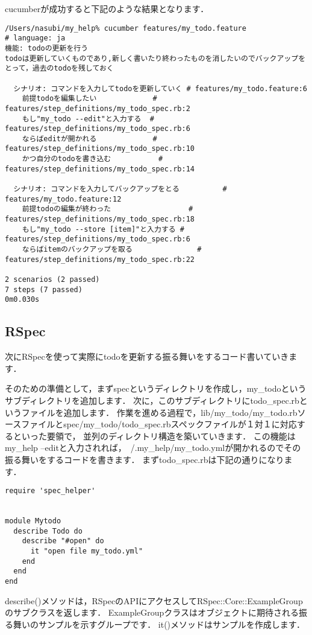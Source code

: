 cucumberが成功すると下記のような結果となります．
\begin{lstlisting}[style=customRuby]
/Users/nasubi/my_help% cucumber features/my_todo.feature 
# language: ja
機能: todoの更新を行う
todoは更新していくものであり,新しく書いたり終わったものを消したいのでバックアップをとって，過去のtodoを残しておく

  シナリオ: コマンドを入力してtodoを更新していく # features/my_todo.feature:6
    前提todoを編集したい             # features/step_definitions/my_todo_spec.rb:2
    もし"my_todo --edit"と入力する  # features/step_definitions/my_todo_spec.rb:6
    ならばeditが開かれる             # features/step_definitions/my_todo_spec.rb:10
    かつ自分のtodoを書き込む           # features/step_definitions/my_todo_spec.rb:14

  シナリオ: コマンドを入力してバックアップをとる          # features/my_todo.feature:12
    前提todoの編集が終わった                  # features/step_definitions/my_todo_spec.rb:18
    もし"my_todo --store [item]"と入力する # features/step_definitions/my_todo_spec.rb:6
    ならばitemのバックアップを取る               # features/step_definitions/my_todo_spec.rb:22

2 scenarios (2 passed)
7 steps (7 passed)
0m0.030s

\end{lstlisting}
\subsection{RSpec}
次にRSpecを使って実際にtodoを更新する振る舞いをするコード書いていきます．

そのための準備として，まずspecというディレクトリを作成し，my\_todoというサブディレクトリを追加します．
次に，このサブディレクトリにtodo\_spec.rbというファイルを追加します．
作業を進める過程で，lib/my\_todo/my\_todo.rbソースファイルとspec/my\_todo/todo\_spec.rbスペックファイルが１対１に対応するといった要領で，
並列のディレクトリ構造を築いていきます．
この機能はmy\_help --editと入力されれば，~/.my\_help/my\_todo.ymlが開かれるのでその振る舞いをするコードを書きます．
まずtodo\_spec.rbは下記の通りになります．
\begin{lstlisting}[style=customRuby]
require 'spec_helper'


module Mytodo
  describe Todo do
    describe "#open" do
      it "open file my_todo.yml" 
    end
  end
end

\end{lstlisting}
describe()メソッドは，RSpecのAPIにアクセスしてRSpec::Core::ExampleGroupのサブクラスを返します．
ExampleGroupクラスはオブジェクトに期待される振る舞いのサンプルを示すグループです．
it()メソッドはサンプルを作成します．


